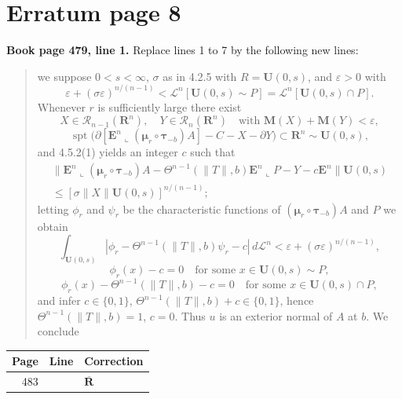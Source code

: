 \documentclass[11pt]{article}
\makeatletter
\newcommand{\R}{\mathbf R}
\newcommand{\Leb}{\mathscr L}
\newcommand{\restrict}{\mathbin{\llcorner}}
\newcommand{\spt}{\operatorname{spt}}
\newcommand{\U}{\mathbf U}
\newcommand{\E}{\mathbf E}
\newcommand{\M}{\mathbf M}
\newcommand{\entry}[3]{#1&#2&#3\\[4pt]}
\newenvironment{corrections}{%
  \begin{longtable}{@{}r >{\raggedright\arraybackslash}p{21mm} >{\raggedright\arraybackslash}p{118mm}@{}}
  \textbf{Page}&\textbf{Line}&\textbf{Correction}\\\hline\endhead
}{\end{longtable}}
\makeatother
\begin{document}
\section*{Erratum page 8}
\noindent\textbf{Book page 479, line 1.} Replace lines 1 to 7 by the following new lines:
\begin{quote}
we suppose $0<s<\infty$, $\sigma$ as in 4.2.5 with $R=\U(0,s)$, and $\varepsilon>0$ with
\[
\varepsilon+(\sigma\varepsilon)^{n/(n-1)}<\Leb^n[\U(0,s)\sim P]=\Leb^n[\U(0,s)\cap P].
\]
Whenever $r$ is sufficiently large there exist
\[
X\in\mathscr R_{n-1}(\R^n),\quad Y\in\mathscr R_n(\R^n)
\quad\text{with }\M(X)+\M(Y)<\varepsilon,
\]
\[
\spt\bigl(\partial[\E^n\restrict(\bm\mu_r\circ\bm\tau_{-b})A]-C-X-\partial Y\bigr)
\subset\R^n\sim\U(0,s),
\]
and 4.5.2(1) yields an integer $c$ such that
\begin{multline*}
\bigl\|\E^n\restrict(\bm\mu_r\circ\bm\tau_{-b})A
-\Theta^{n-1}(\|T\|,b)\E^n\restrict P-Y-c\E^n\bigr\|\U(0,s)\\
\le[\sigma\|X\|\U(0,s)]^{n/(n-1)};
\end{multline*}
letting $\phi_r$ and $\psi_r$ be the characteristic functions of
$(\bm\mu_r\circ\bm\tau_{-b})A$ and $P$ we obtain
\[
\int_{\U(0,s)}|\phi_r-\Theta^{n-1}(\|T\|,b)\psi_r-c|\,d\Leb^n
<\varepsilon+(\sigma\varepsilon)^{n/(n-1)},
\]
\[
\phi_r(x)-c=0\quad\text{for some }x\in\U(0,s)\sim P,
\]
\[
\phi_r(x)-\Theta^{n-1}(\|T\|,b)-c=0\quad\text{for some }x\in\U(0,s)\cap P,
\]
and infer $c\in\{0,1\}$, $\Theta^{n-1}(\|T\|,b)+c\in\{0,1\}$,
hence $\Theta^{n-1}(\|T\|,b)=1$, $c=0$. Thus $u$ is an exterior normal of
$A$ at $b$. We conclude
\end{quote}
\begin{corrections}
\entry{483}{5}{$\overline{\R}$}
\end{corrections}
\end{document}
